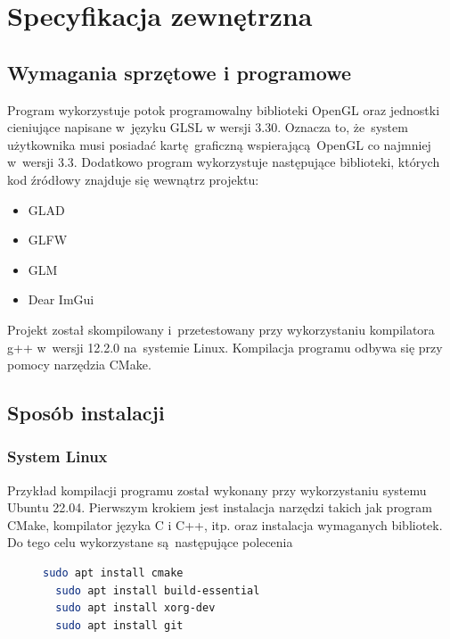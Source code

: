 \chapter{Specyfikacja zewnętrzna}
\label{ch:04}

\section{Wymagania sprzętowe i programowe}

Program wykorzystuje potok programowalny biblioteki OpenGL oraz jednostki cieniujące napisane w~języku GLSL w wersji 3.30. Oznacza to, że~system użytkownika musi posiadać kartę graficzną wspierającą OpenGL co najmniej w~wersji 3.3.
Dodatkowo program wykorzystuje następujące biblioteki, których kod źródłowy znajduje się wewnątrz projektu:
\begin{itemize}
\item GLAD
\item GLFW
\item GLM
\item Dear ImGui
\end{itemize}

Projekt został skompilowany i~przetestowany przy wykorzystaniu kompilatora g++
w~wersji 12.2.0 na~systemie Linux. Kompilacja programu odbywa się przy pomocy narzędzia CMake.

\section{Sposób instalacji}
\subsection{System Linux}
Przykład kompilacji programu został wykonany przy wykorzystaniu systemu Ubuntu 22.04. Pierwszym krokiem jest instalacja narzędzi takich jak program CMake, kompilator języka C i C++, itp. oraz instalacja wymaganych bibliotek.
Do tego celu wykorzystane są następujące polecenia
\begin{figure}[H]
\lstset{basicstyle=\ttfamily, language=bash}
\begin{lstlisting}[language=bash]
  sudo apt install cmake
  sudo apt install build-essential
  sudo apt install xorg-dev
  sudo apt install git
\end{lstlisting}
\end{figure}

